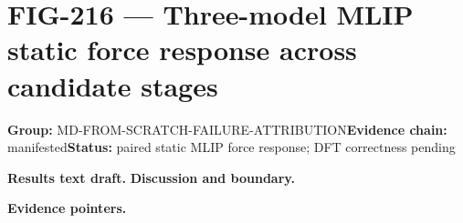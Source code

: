 \clearpage
\section{FIG-216 --- Three-model MLIP static force response across candidate stages}
\label{figpage:fig-216}
\textbf{Group:} MD-FROM-SCRATCH-FAILURE-ATTRIBUTION\quad \textbf{Evidence chain:} manifested\quad \textbf{Status:} paired static MLIP force response; DFT correctness pending

\textbf{Results text draft.} 
\textbf{Discussion and boundary.} 


\textbf{Evidence pointers.}



\vfill

